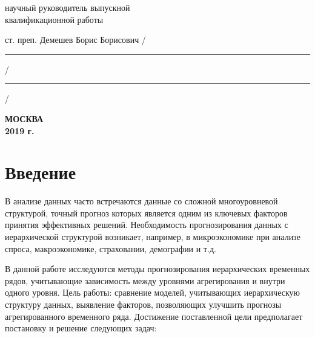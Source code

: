 \documentclass[12pt,a4paper, oneside]{extreport}
\begin{document}
\hfill{}

\noindent
научный руководитель выпускной \\
квалификационной работы

\noindent
ст. преп. Демешев Борис Борисович
\hfill /\rule{6em}{0.5pt}/\rule{6em}{0.5pt}/

\hfill{}

%
%

\vfill

\begin{center}
\normalsize \bfseries МОСКВА \\ 2019 г.
\end{center}
\endgroup




\tableofcontents  %



\chapter*{Введение}


В анализе данных часто встречаются данные со сложной многоуровневой структурой, точный прогноз которых является одним из ключевых факторов принятия эффективных решений. 
Необходимость прогнозирования данных с иерархической структурой возникает, например, в микроэкономике при анализе спроса, макроэкономике, страховании,  демографии и т.д. 


В данной работе исследуются методы прогнозирования иерархических временных рядов, учитывающие зависимость между уровнями агрегирования и внутри одного уровня. 
Цель работы: сравнение моделей, учитывающих иерархическую структуру данных, выявление факторов, позволяющих улучшить прогнозы агрегированного временного ряда.
Достижение поставленной цели предполагает постановку и решение следующих задач:
\end{document}
